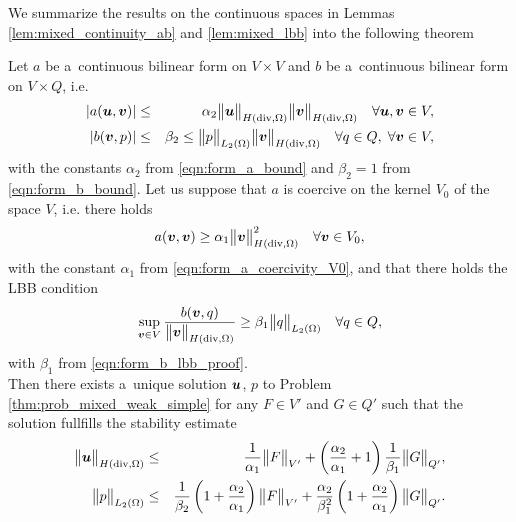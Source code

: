 We summarize the results on the continuous spaces in Lemmas \ref{lem:mixed_continuity_ab} and \ref{lem:mixed_lbb} into the following theorem
\begin{theorem} \label{thm:brezzi_theorem}
Let $a$ be a~continuous bilinear form on $V\times V$ and $b$ be a~continuous bilinear form on $V\times Q$, i.e.
\begin{eqnarray}
    \left|a(\mathbf{\boldsymbol{u}},\mathbf{\boldsymbol{v}})\right| &\leq& \alpha_2 \bigl\Vert\mathbf{\boldsymbol{u}}\bigr\Vert_{H({\rm div},\Omega)} \bigl\Vert\mathbf{\boldsymbol{v}}\bigr\Vert_{H({\rm div},\Omega)} \quad \forall \mathbf{\boldsymbol{u}},\mathbf{\boldsymbol{v}}\in V,\\
    \left|b(\mathbf{\boldsymbol{v}},p)\right| &\leq& \beta_2 \leq \bigl\Vert p\bigr\Vert_{L_2(\Omega)} \bigl\Vert\mathbf{\boldsymbol{v}}\bigr\Vert_{H({\rm div},\Omega)} \quad \forall q\in Q,\;\forall \mathbf{\boldsymbol{v}}\in V,
\end{eqnarray}
with the constants $\alpha_2$ from \eqref{eqn:form_a_bound} and $\beta_2=1$ from \eqref{eqn:form_b_bound}.
Let us suppose that $a$ is coercive on the kernel $V_0$ of the space $V$, i.e. there holds
\begin{equation}
    a(\mathbf{\boldsymbol{v}},\mathbf{\boldsymbol{v}}) \geq \alpha_1 \bigl\Vert\mathbf{\boldsymbol{v}}\bigr\Vert^2_{H({\rm div},\Omega)} \quad \forall \mathbf{\boldsymbol{v}}\in V_0,
\end{equation}
with the constant $\alpha_1$ from \eqref{eqn:form_a_coercivity_V0},
and that there holds the LBB condition
\begin{equation} \label{eqn:brezzi_theorem_lbb}
    \sup_{\mathbf{\boldsymbol{v}}\in V} \frac{b(\mathbf{\boldsymbol{v}},q)}{\bigl\Vert\mathbf{\boldsymbol{v}}\bigr\Vert_{H({\rm div},\Omega)}} \geq \beta_1\bigl\Vert q\bigr\Vert_{L_2(\Omega)} \quad \forall q\in Q,
\end{equation}
with $\beta_1$ from \eqref{eqn:form_b_lbb_proof}.\\
Then there exists a~unique solution $\mathbf{\boldsymbol{u}}$, $p$ to Problem \eqref{thm:prob_mixed_weak_simple} for any $F\in V'$ and $G\in Q'$
such that the solution fullfills the stability estimate
\begin{eqnarray}
    \bigl\Vert\mathbf{\boldsymbol{u}}\bigr\Vert_{H({\rm div},\Omega)} &\leq& \frac{1}{\alpha_1} \bigl\Vert F\bigr\Vert_{V'} + \left( \frac{\alpha_2}{\alpha_1} + 1\right)\frac{1}{\beta_1} \bigl\Vert G\bigr\Vert_{Q'},\\
    \bigl\Vert p\bigr\Vert_{L_2(\Omega)} &\leq& \frac{1}{\beta_2} \left(1+ \frac{\alpha_2}{\alpha_1} \right) \bigl\Vert F\bigr\Vert_{V'}
            + \frac{\alpha_2}{\beta_1^2} \left( 1+ \frac{\alpha_2}{\alpha_1}\right) \bigl\Vert G\bigr\Vert_{Q'}.
\end{eqnarray}
\end{theorem}
